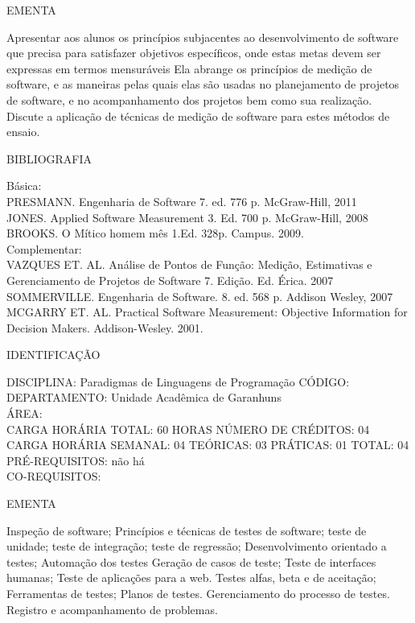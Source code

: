 \documentclass[
	12pt,				%
	openright,			%
  oneside,     %
	a4paper,			%
	english,			%
	french,				%
	spanish,			%
	brazil				%
	]{abntex2}
\begin{document}
\begin{apendicesenv}
EMENTA 

Apresentar aos alunos os princípios subjacentes ao desenvolvimento de software que precisa para satisfazer objetivos específicos, onde estas metas devem ser expressas em termos mensuráveis Ela abrange os princípios de medição de software, e as maneiras pelas quais elas são usadas no planejamento de projetos de software, e no acompanhamento dos projetos bem como sua realização. Discute a aplicação de técnicas de medição de software para estes métodos de ensaio.

BIBLIOGRAFIA 

Básica:\\
PRESMANN. Engenharia de Software 7. ed. 776 p. McGraw-Hill, 2011\\
JONES. Applied Software Measurement 3. Ed. 700 p. McGraw-Hill, 2008\\
BROOKS. O Mítico homem mês 1.Ed. 328p. Campus. 2009.\\
Complementar:\\
VAZQUES ET. AL. Análise de Pontos de Função: Medição, Estimativas e
Gerenciamento de Projetos de Software  7. Edição. Ed. Érica. 2007\\
SOMMERVILLE. Engenharia de Software. 8. ed. 568 p. Addison Wesley, 2007\\
MCGARRY ET. AL. Practical Software Measurement: Objective Information
for Decision Makers. Addison-Wesley. 2001.

\newpage IDENTIFICAÇÃO

DISCIPLINA: Paradigmas de Linguagens de Programação CÓDIGO:\\ 
DEPARTAMENTO: Unidade Acadêmica de Garanhuns\\
ÁREA: \\
CARGA HORÁRIA TOTAL: 60 HORAS NÚMERO DE CRÉDITOS: 04\\
CARGA HORÁRIA SEMANAL: 04 TEÓRICAS: 03 PRÁTICAS: 01 TOTAL: 04 \\
PRÉ-REQUISITOS: não há\\
CO-REQUISITOS: 

EMENTA 

Inspeção de software; Princípios e técnicas de testes de software; teste
de unidade; teste de integração; teste de regressão; Desenvolvimento
orientado a testes; Automação dos testes
Geração de casos de teste; Teste de interfaces humanas; Teste de
aplicações para a web. 
Testes alfas, beta e de aceitação; Ferramentas de testes; Planos de
testes. Gerenciamento do processo de testes. Registro e acompanhamento
de problemas.


\end{apendicesenv}
\end{document}
